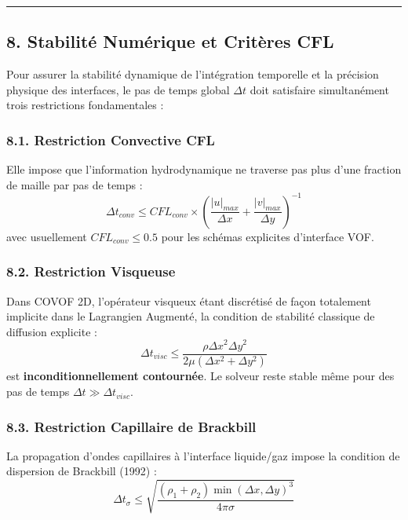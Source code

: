 \documentclass[
  french,
]{article}
\begin{document}
\begin{center}\rule{0.5\linewidth}{0.5pt}\end{center}

\subsection{8. Stabilité Numérique et Critères
CFL}\label{stabilituxe9-numuxe9rique-et-crituxe8res-cfl}

Pour assurer la stabilité dynamique de l'intégration temporelle et la
précision physique des interfaces, le pas de temps global \(\Delta t\)
doit satisfaire simultanément trois restrictions fondamentales :

\subsubsection{8.1. Restriction Convective
CFL}\label{restriction-convective-cfl}

Elle impose que l'information hydrodynamique ne traverse pas plus d'une
fraction de maille par pas de temps :
\[\Delta t_{conv} \le CFL_{conv} \times \left( \frac{|u|_{max}}{\Delta x} + \frac{|v|_{max}}{\Delta y} \right)^{-1}\]
avec usuellement \(CFL_{conv} \le 0.5\) pour les schémas explicites
d'interface VOF.

\subsubsection{8.2. Restriction Visqueuse}\label{restriction-visqueuse}

Dans COVOF 2D, l'opérateur visqueux étant discrétisé de façon totalement
implicite dans le Lagrangien Augmenté, la condition de stabilité
classique de diffusion explicite :
\[\Delta t_{visc} \le \frac{\rho \Delta x^2 \Delta y^2}{2 \mu (\Delta x^2 + \Delta y^2)}\]
est \textbf{inconditionnellement contournée}. Le solveur reste stable
même pour des pas de temps \(\Delta t \gg \Delta t_{visc}\).

\subsubsection{8.3. Restriction Capillaire de
Brackbill}\label{restriction-capillaire-de-brackbill}

La propagation d'ondes capillaires à l'interface liquide/gaz impose la
condition de dispersion de Brackbill (1992) :
\[\Delta t_\sigma \le \sqrt{\frac{(\rho_1 + \rho_2) \min(\Delta x, \Delta y)^3}{4 \pi \sigma}}\]
\end{document}
